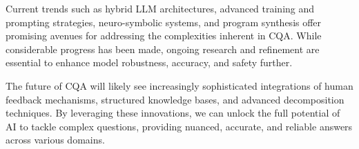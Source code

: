 \documentclass[12pt]{article}
\begin{document}
Current trends such as hybrid LLM architectures, advanced training and prompting strategies, neuro-symbolic systems, and program synthesis offer promising avenues for addressing the complexities inherent in CQA. While considerable progress has been made, ongoing research and refinement are essential to enhance model robustness, accuracy, and safety further.

The future of CQA will likely see increasingly sophisticated integrations of human feedback mechanisms, structured knowledge bases, and advanced decomposition techniques. By leveraging these innovations, we can unlock the full potential of AI to tackle complex questions, providing nuanced, accurate, and reliable answers across various domains.



\end{document}
